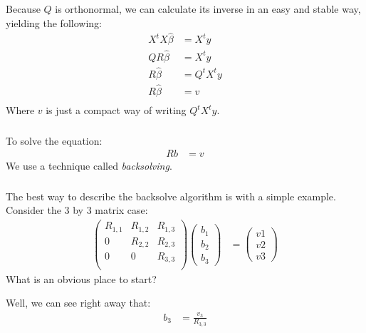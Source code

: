 \begin{frame}[fragile] \frametitle{}

Because $Q$ is orthonormal, we can calculate its inverse in an
easy and stable way, yielding the following:
\begin{align*}
X^t X \widehat{\beta} &= X^t y \\
Q R \widehat{\beta} &= X^t y \\
R \widehat{\beta} &= Q^t X^t y \\
R \widehat{\beta} &= v \\
\end{align*}
Where $v$ is just a compact way of writing $Q^t X^t y$.

\end{frame}

\begin{frame}[fragile] \frametitle{}

To solve the equation:
\begin{align*}
R b &= v
\end{align*}
We use a technique called \textit{backsolving}.

\end{frame}

\begin{frame}[fragile] \frametitle{}

The best way to describe the backsolve algorithm is with a
simple example. Consider the 3 by 3 matrix case:
\begin{align*}
\left(
\begin{array}{ccc} R_{1,1} & R_{1,2} & R_{1,3} \\
                   0       & R_{2,2} & R_{2,3} \\
                   0       & 0       & R_{3,3} \\
\end{array} \right) \left(\begin{array}{c} b_1 \\ b_2 \\ b_3 \end{array} \right)
 &= \left(\begin{array}{c} v1 \\ v2 \\ v3 \end{array} \right)
\end{align*}
\pause What is an obvious place to start?

\pause Well, we can see right away that:
\begin{align*}
b_3 &= \frac{v_3}{R_{3,3}}
\end{align*}

\end{frame}

